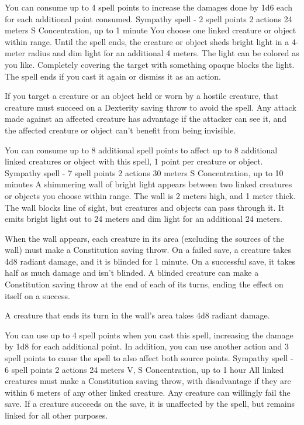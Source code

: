         You can consume up to 4 spell points to increase the damages done by 1d6 each for each additional point consumed.
        {Sympathy spell - 2 spell points}
        {2 actions}
        {24 meters}
        {S}
        {Concentration, up to 1 minute}
        You choose one linked creature or object within range.
        Until the spell ends, the creature or object sheds bright light in a 4-meter radius and dim light for an additional 4 meters.
        The light can be colored as you like.
        Completely covering the target with something opaque blocks the light.
        The spell ends if you cast it again or dismiss it as an action.

        If you target a creature or an object held or worn by a hostile creature, that creature must succeed on a Dexterity saving throw to avoid the spell.
        Any attack made against an affected creature has advantage if the attacker can see it, and the affected creature or object can't benefit from being invisible.

        You can consume up to 8 additional spell points to affect up to 8 additional linked creatures or object with this spell, 1 point per creature or object.
        {Sympathy spell - 7 spell points}
        {2 actions}
        {30 meters}
        {S}
        {Concentration, up to 10 minutes}
        A shimmering wall of bright light appears between two linked creatures or objects you choose within range.
        The wall is 2 meters high, and 1 meter thick.
        The wall blocks line of sight, but creatures and objects can pass through it.
        It emits bright light out to 24 meters and dim light for an additional 24 meters.

        When the wall appears, each creature in its area (excluding the sources of the wall) must make a Constitution saving throw.
        On a failed save, a creature takes 4d8 radiant damage, and it is blinded for 1 minute.
        On a successful save, it takes half as much damage and isn't blinded.
        A blinded creature can make a Constitution saving throw at the end of each of its turns, ending the effect on itself on a success.

        A creature that ends its turn in the wall's area takes 4d8 radiant damage.

        You can use up to 4 spell points when you cast this spell, increasing the damage by 1d8 for each additional point.
        In addition, you can use another action and 3 spell points to cause the spell to also affect both source points.
        {Sympathy spell - 6 spell points}
        {2 actions}
        {24 meters}
        {V, S}
        {Concentration, up to 1 hour}
        All linked creatures must make a Constitution saving throw, with disadvantage if they are within 6 meters of any other linked creature.
        Any creature can willingly fail the save.
        If a creature succeeds on the save, it is unaffected by the spell, but remains linked for all other purposes.

